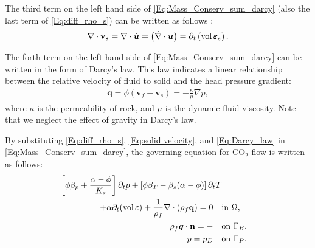 The {third} term on the left hand side of \eqref{Eq:Mass_Conserv_sum_darcy} (also the last term of \eqref{Eq:diff_rho_s}) can be written as follows \cite{merxhani2016introduction}:
\begin{equation} \label{Eq:solid velocity}
\begin{aligned}
\nabla \cdot \mathbf{v}_s=\nabla \cdot \dot{\bm{u}}= \left(\dot{\nabla}\cdot\bm{u}\right)=\partial_t\left(\operatorname{vol}\bm{\varepsilon}_e\right).
\end{aligned}
\end{equation}

The {forth} term on the left hand side of \eqref{Eq:Mass_Conserv_sum_darcy} can be written in the form of Darcy's law. This law indicates a linear relationship between the relative velocity of fluid to solid and the head pressure gradient:
\begin{equation}\label{Eq:Darcy_law}
\begin{aligned}
\mathbf{q} = \phi \left(\mathbf{v}_f-\mathbf{v}_s \right) = -\frac{\kappa}{\mu} \nabla p,
\end{aligned}
\end{equation}
where $\kappa$ is the permeability of rock, and $\mu$ is the dynamic fluid viscosity. 
Note that we neglect the effect of gravity in Darcy's law. %

By substituting \deleted{\eqref{Eq:diff_rho_f}, }\eqref{Eq:diff_rho_s}, \eqref{Eq:solid velocity}, and \eqref{Eq:Darcy_law} in \eqref{Eq:Mass_Conserv_sum_darcy}, the governing equation for CO$_2$ flow is written as follows:
\begin{equation}\label{Eq:General_pressure}
\begin{aligned}
\left[\phi\beta_p +\frac{\alpha-\phi}{K_s}\right]\partial_t p+\left[\phi\beta_T-\beta_s(\alpha-\phi)\right]\partial_t T\\+\alpha \partial_t(\operatorname{vol}\varepsilon)+\frac{1}{\rho_f}\nabla\cdot \left(\rho_f\mathbf{q}\right)=0 \quad &\text{in~} \Omega,\\
\rho_f\bm{q} \cdot \mathbf{n} =- \quad  &\text{on~} \Gamma_B,\\
p = p_D \quad &\text{on~}\Gamma_P.
\end{aligned}
\end{equation}

